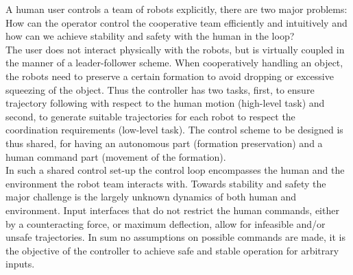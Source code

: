 \documentclass[a4paper,twoside, openright,12pt]{report}
\begin{document}
{A human user controls a team of robots explicitly, there are two major problems: How can the operator control the cooperative team efficiently and intuitively and how can we achieve stability and safety with the human in the loop?\\
The user does not interact physically with the robots, but is virtually coupled in the manner of a leader-follower scheme. When cooperatively handling an object, the robots need to preserve a certain formation to avoid dropping or excessive squeezing of the object. Thus the controller has two tasks, first, to ensure trajectory following with respect to the human motion (high-level task) and second, to generate suitable trajectories for each robot to respect the coordination requirements (low-level task). The control scheme to be designed is thus shared, for having an autonomous part (formation preservation) and a human command part (movement of the formation).\\
In such a shared control set-up the control loop encompasses the human and the environment the robot team interacts with. 
Towards stability and safety the major challenge is the largely unknown dynamics of both human and environment.
Input interfaces that do not restrict the human commands, either by a counteracting force, or maximum deflection, allow for infeasible and/or unsafe trajectories. In sum no assumptions on possible commands are made, it is the objective of the controller to achieve safe and stable operation for arbitrary inputs.

}
\end{document}
